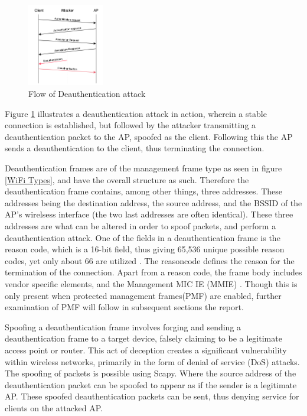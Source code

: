 \begin{figure}[!htbp]
    \centering
    \includegraphics[width=0.3\textwidth]{Latex-Files/Billeder/Implementation/deauth_transmission.png}
    \caption{Flow of Deauthentication attack}
    \label{deauth_flow}
\end{figure}

Figure \ref{deauth_flow} illustrates a deauthentication attack in action, wherein a stable connection is established, but followed by the attacker transmitting a deauthentication packet to the AP, spoofed as the client. Following this the AP sends a deauthentication to the client, thus terminating the connection.

Deauthentication frames are of the management frame type as seen in figure \ref{WiFi Types}, and have the overall structure as such. Therefore the deauthentication frame contains, among other things, three addresses. These addresses being the destination address, the source address, and the BSSID of the AP's wirelsess interface (the two last addresses are often identical). These three addresses are what can be altered in order to spoof packets, and perform a deauthentication attack. One of the fields in a deauthentication frame is the reason code, which is a 16-bit field, thus giving 65,536 unique possible reason codes, yet only about 66 are utilized \cite{Cisco_Deathentication_reasoncodes}. The reasoncode defines the reason for the termination of the connection. Apart from a reason code, the frame body includes vendor specific elements, and the Management MIC IE (MMIE) \cite{IEEE_802.11w}. Though this is only present when protected management frames(PMF) are enabled, further examination of PMF will follow in subsequent sections the report.

Spoofing a deauthentication frame involves forging and sending a deauthentication frame to a target device, falsely claiming to be a legitimate access point or router. This act of deception creates a significant vulnerability within wireless networks, primarily in the form of denial of service (DoS) attacks. The spoofing of packets is possible using Scapy. Where the source address of the deauthentication packet can be spoofed to appear as if the sender is a legitimate AP.
These spoofed deauthentication packets can be sent, thus denying service for clients on the attacked AP.

